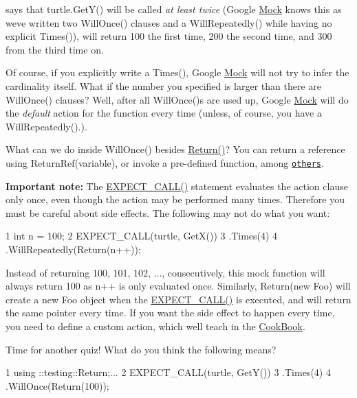 says that {\ttfamily turtle.\+Get\+Y()} will be called {\itshape at least twice} (Google \hyperlink{class_mock}{Mock} knows this as we\textquotesingle{}ve written two {\ttfamily Will\+Once()} clauses and a {\ttfamily Will\+Repeatedly()} while having no explicit {\ttfamily Times()}), will return 100 the first time, 200 the second time, and 300 from the third time on.

Of course, if you explicitly write a {\ttfamily Times()}, Google \hyperlink{class_mock}{Mock} will not try to infer the cardinality itself. What if the number you specified is larger than there are {\ttfamily Will\+Once()} clauses? Well, after all {\ttfamily Will\+Once()}s are used up, Google \hyperlink{class_mock}{Mock} will do the {\itshape default} action for the function every time (unless, of course, you have a {\ttfamily Will\+Repeatedly()}.).

What can we do inside {\ttfamily Will\+Once()} besides {\ttfamily \hyperlink{namespacetesting_af6d1c13e9376c77671e37545cd84359c}{Return()}}? You can return a reference using {\ttfamily Return\+Ref(variable)}, or invoke a pre-\/defined function, among \href{CheatSheet.md#actions}{\tt others}.

{\bfseries Important note\+:} The {\ttfamily \hyperlink{gmock-spec-builders_8h_a535a6156de72c1a2e25a127e38ee5232}{E\+X\+P\+E\+C\+T\+\_\+\+C\+A\+L\+L()}} statement evaluates the action clause only once, even though the action may be performed many times. Therefore you must be careful about side effects. The following may not do what you want\+:


\begin{DoxyCode}
1 int n = 100;
2 EXPECT\_CALL(turtle, GetX())
3 .Times(4)
4 .WillRepeatedly(Return(n++));
\end{DoxyCode}


Instead of returning 100, 101, 102, ..., consecutively, this mock function will always return 100 as {\ttfamily n++} is only evaluated once. Similarly, {\ttfamily Return(new Foo)} will create a new {\ttfamily Foo} object when the {\ttfamily \hyperlink{gmock-spec-builders_8h_a535a6156de72c1a2e25a127e38ee5232}{E\+X\+P\+E\+C\+T\+\_\+\+C\+A\+L\+L()}} is executed, and will return the same pointer every time. If you want the side effect to happen every time, you need to define a custom action, which we\textquotesingle{}ll teach in the \hyperlink{v1__7_2_cook_book_8md}{Cook\+Book}.

Time for another quiz! What do you think the following means?


\begin{DoxyCode}
1 using ::testing::Return;...
2 EXPECT\_CALL(turtle, GetY())
3 .Times(4)
4 .WillOnce(Return(100));
\end{DoxyCode}


